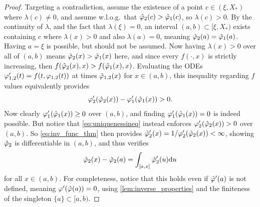 \begin{proof}
    Targeting a contradiction, assume the existence of a point $c\in(\xi,X_*)$ where $\lambda(c)\neq 0$, and assume w.l.o.g.~that $\hat{\varphi}_2(c)>\hat{\varphi}_1(c)$, so $\lambda(c)>0$. By the continuity of $\lambda$, and the fact that $\lambda(\xi)=0$, an interval $(a,b)\subset[\xi,X_*)$ exists containing $c$ where $\lambda(x)>0$ and also $\lambda(a)=0$, meaning $\hat{\varphi}_2(a)=\hat{\varphi}_1(a)$. Having $a=\xi$ is possible, but should not be assumed. Now having $\lambda(x)>0$ over all of $(a,b)$ means $\hat{\varphi}_2(x)>\hat{\varphi}_1(x)$ here, and since every $f(\cdot,x)$ is strictly increasing, then $f(\hat{\varphi}_2(x),x) > f(\hat{\varphi}_1(x),x)$. Evaluating the ODEs $\varphi'_{1,2}(t)=f(t,\varphi_{1,2}(t))$ at times $\hat{\varphi}_{1,2}(x)$ for $x\in(a,b)$, this inequality regarding $f$ values equivalently provides
    \begin{equation}\label{eq:uniquenessineq}
        \varphi'_2(\hat{\varphi}_2(x)) - \varphi'_1(\hat{\varphi}_1(x)) > 0.
    \end{equation}
    Now clearly $\varphi_1'(\hat{\varphi}_1(x))\ge0$ over $(a,b)$, and finding $\varphi_1'(\hat{\varphi}_1(x))=0$ is indeed possible. But notice that \autoref{eq:uniquenessineq} instead enforces $\varphi_2'(\hat{\varphi}_2(x))>0$ over $(a,b)$. So \autoref{eq:inv_func_thm} then provides $\hat{\varphi}_2'(x)=1/\varphi_2'(\hat{\varphi}_2(x))<\infty$, showing $\hat{\varphi}_2$ is differentiable in $(a,b)$, and thus verifies
    \begin{equation}\label{eq:u1}
        \hat{\varphi}_2(x) - \hat{\varphi}_2(a) = \int_{[a,x]} \hat{\varphi}_2'(u)\mathrm{d} u
    \end{equation}
    for all $x\in(a,b)$. For completeness, notice that this holds even if $\hat{\varphi}'(a)$ is not defined, meaning $\varphi'(\hat{\varphi}(a))=0$, using \autoref{lem:inverse_properties} and the finiteness of the singleton $\{a\}\subset[a,b)$.


\end{proof}
